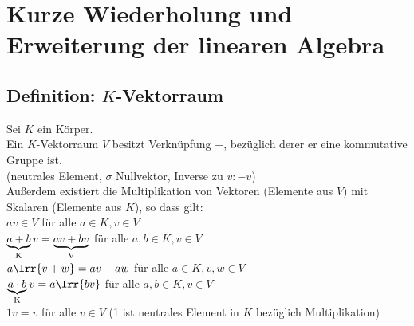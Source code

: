 \newpage
\section{Kurze Wiederholung und Erweiterung der linearen Algebra}
\subsection{Definition: $K$-Vektorraum}
	Sei $K$ ein Körper.\\
	Ein $K$-Vektorraum $V$ besitzt Verknüpfung $+$, bezüglich derer er eine kommutative Gruppe ist.\\
	(neutrales Element, $\sigma$ Nullvektor, Inverse zu $v:-v$)\\
	Außerdem existiert die Multiplikation von Vektoren (Elemente aus $V$) mit Skalaren (Elemente aus $K$), so dass gilt:\\
	$av\in V$ für alle $a\in K, v\in V$\\
	$\underbrace{a+b}_{\mbox{\scriptsize K}}v=\underbrace{av+bv}_{\mbox{\scriptsize V}}$ für alle $a,b\in K, v\in V$\\
	$a\lrr{v+w}=av+aw$ für alle $a\in K,v,w\in V$\\
	$\underbrace{a\cdot b}_{\mbox{\scriptsize K}}v=a\lrr{bv}$ für alle $a,b\in K, v\in V$\\
	$1v=v$ für alle $v\in V$ (1 ist neutrales Element in $K$ bezüglich Multiplikation)

